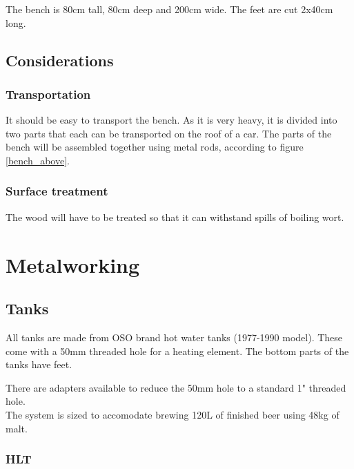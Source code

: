 \documentclass[11pt,fleqn]{book} %
\begin{document}
The bench is 80cm tall, 80cm deep and 200cm wide. The feet are cut 2x40cm long.

\section{Considerations}

\subsection{Transportation}

It should be easy to transport the bench. As it is very heavy, it is divided into two parts that each can be transported on the roof of a car. The parts of the bench will be assembled together using metal rods, according to figure \ref{bench_above}.

\subsection{Surface treatment}

The wood will have to be treated so that it can withstand spills of boiling wort.



\chapter{Metalworking}

\section{Tanks}

All tanks are made from OSO brand hot water tanks (1977-1990 model). These come with a 50mm threaded hole for a heating element. The bottom parts of the tanks have feet.

There are adapters available to reduce the 50mm hole to a standard 1" threaded hole.\\

The system is sized to accomodate brewing 120L of finished beer using 48kg of malt.

\subsection{HLT}
\end{document}
